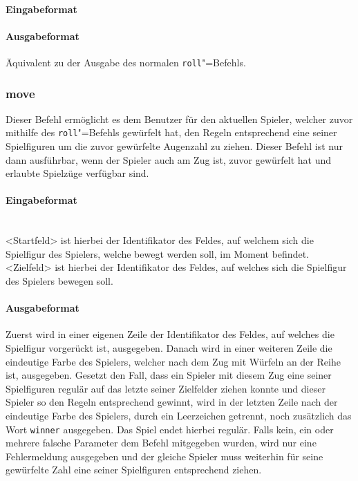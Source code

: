 \paragraph*{Eingabeformat}
\paragraph*{Ausgabeformat}
Äquivalent zu der Ausgabe des normalen \texttt{roll}"=Befehls.

\subsubsection*{move}
Dieser Befehl ermöglicht es dem Benutzer für den aktuellen Spieler, welcher zuvor mithilfe des \texttt{roll}"=Befehls gewürfelt hat, den Regeln entsprechend eine seiner Spielfiguren um die zuvor gewürfelte Augenzahl zu ziehen. Dieser Befehl ist nur dann ausführbar, wenn der Spieler auch am Zug ist, zuvor gewürfelt hat und erlaubte Spielzüge verfügbar sind.
\paragraph{Eingabeformat}
\\
<Startfeld> ist hierbei der Identifikator des Feldes, auf welchem sich die Spielfigur des Spielers, welche bewegt werden soll, im Moment befindet.\\
<Zielfeld> ist hierbei der Identifikator des Feldes, auf welches sich die Spielfigur des Spielers bewegen soll.
\paragraph{Ausgabeformat}
Zuerst wird in einer eigenen Zeile der Identifikator des Feldes, auf welches die Spielfigur vorgerückt ist, ausgegeben. Danach wird in einer weiteren Zeile die eindeutige Farbe des Spielers, welcher nach dem Zug mit Würfeln an der Reihe ist, ausgegeben.
Gesetzt den Fall, dass ein Spieler mit diesem Zug eine seiner Spielfiguren regulär auf das letzte seiner Zielfelder ziehen konnte und dieser Spieler so den Regeln entsprechend gewinnt, wird in der letzten Zeile nach der eindeutige Farbe des Spielers, durch ein Leerzeichen getrennt, noch zusätzlich das Wort \texttt{winner} ausgegeben. Das Spiel endet hierbei regulär.
Falls kein, ein oder mehrere falsche Parameter dem Befehl mitgegeben wurden, wird nur eine Fehlermeldung ausgegeben und der gleiche Spieler muss weiterhin für seine gewürfelte Zahl eine seiner Spielfiguren entsprechend ziehen.

